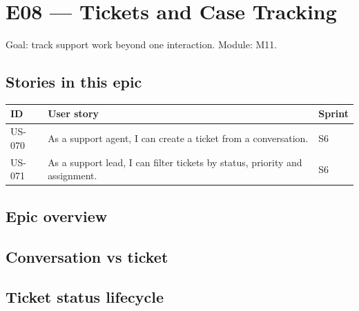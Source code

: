 \chapter{E08 --- Tickets and Case Tracking}

Goal: track support work beyond one interaction. Module: M11.

\section*{Stories in this epic}
{\small
\begin{longtable}{@{}>{\raggedright\arraybackslash}p{}>{\raggedright\arraybackslash}p{}>{\raggedright\arraybackslash}p{}@{}}
\toprule
\textbf{ID} & \textbf{User story} & \textbf{Sprint} \\
\midrule
\endhead
\bottomrule
\endfoot
US-070 & As a support agent, I can create a ticket from a conversation. & S6 \\
US-071 & As a support lead, I can filter tickets by status, priority and assignment. & S6 \\
\end{longtable}
}

\Needspace{143pt}
\section{Epic overview}



\Needspace{201pt}
\section{Conversation vs ticket}



\Needspace{384pt}
\section{Ticket status lifecycle}



